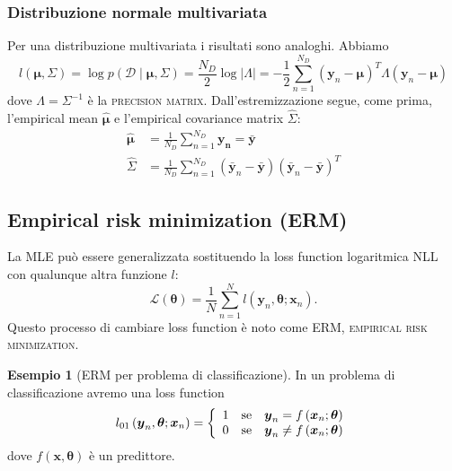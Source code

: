 \documentclass[10pt]{article}
\renewcommand{\vec}[1]{\boldsymbol{#1}}
\newcommand{\HALF}{\frac{1}{2}}
\newcommand{\im}[1]{\textsc{#1}}
\newcommand{\cond}{\mid}
\newcommand{\pare}[1]{
	\ensuremath{\left(#1\right)}
}
\theoremstyle{definition}
\newtheorem{example}{Esempio}[section]
\begin{document}
\subsubsection{Distribuzione normale multivariata}
Per una distribuzione multivariata i risultati sono analoghi. Abbiamo
\begin{equation}
l\pare{\vec{\mu}, \Sigma} = \log p\pare{\mathcal{D}\cond\vec{\mu},\Sigma} = \frac{N_D}{2}\log\left|\Lambda\right| = -\HALF\sum_{n=1}^{N_D}\pare{\vec{y}_n - \vec{\mu}}^T \Lambda\pare{\vec{y}_n - \vec{\mu}}
\end{equation}
dove $\Lambda = \Sigma^{-1}$ è la \im{precision matrix}. Dall'estremizzazione segue, come prima, l'empirical mean $\hat{\vec{\mu}}$ e l'empirical covariance matrix $\hat{\Sigma}$:
\begin{align}
\hat{\vec{\mu}} &= \frac{1}{N_D}\sum_{n=1}^{N_D}\vec{y_n} = \bar{\vec{y}} \\
\hat{\Sigma} &= \frac{1}{N_D}\sum_{n=1}^{N_D}\pare{\bar{\vec{y}}_n - \bar{\vec{y}}}\pare{\bar{\vec{y}}_n - \bar{\vec{y}}}^T 
\end{align}

\subsection{Empirical risk minimization (ERM)}
La MLE può essere generalizzata sostituendo la loss function logaritmica NLL con qualunque altra funzione $l$:
\begin{equation}
\mathcal{L}\pare{\vec{\theta}} = \frac{1}{N}\sum_{n=1}^N l\pare{\vec{y}_n, \vec{\theta}; \vec{x}_n}.
\end{equation}
Questo processo di cambiare loss function è noto come ERM, \im{empirical risk minimization}. %

\begin{example}[ERM per problema di classificazione]
In un problema di classificazione avremo una loss function
\begin{equation}
l_{01}\pare{\vec{y}_n, \vec{\theta}; \vec{x}_n} = \left\{\begin{array}{l@{\quad\text{se}\quad}l}
1 & \vec{y}_n = f\pare{\vec{x}_n; \vec{\theta}} \\
0 & \vec{y}_n \neq f\pare{\vec{x}_n; \vec{\theta}} 
\end{array}\right.
\end{equation}
dove $f\pare{\vec{x}, \vec{\theta}}$ è un predittore.
\end{example}
\end{document}
